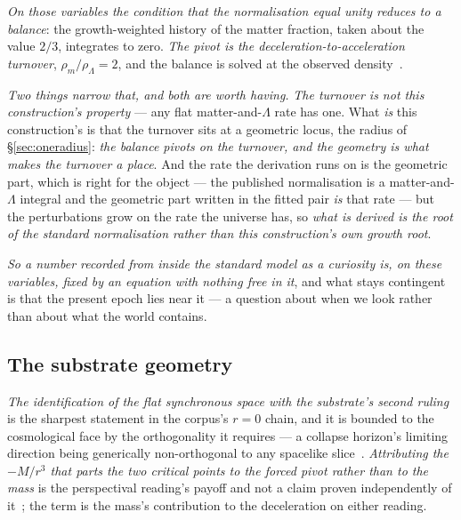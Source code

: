 \documentclass[11pt,a4paper]{article}
\theoremstyle{plain}
\theoremstyle{definition}
\begin{document}
\emph{On those variables the condition that the normalisation equal unity reduces to a balance}: the
growth-weighted history of the matter fraction, taken about the value $2/3$, integrates to zero. \emph{The pivot is the
deceleration-to-acceleration turnover}, $\rho_m/\rho_\Lambda=2$, and the balance is solved at the observed
density~\cite{JanzenCRcosmology}.

\emph{Two things narrow that, and both are worth having.} \emph{The turnover is not this construction's
property} --- any flat matter-and-$\Lambda$ rate has one. What \emph{is} this construction's is that the
turnover sits at a geometric locus, the radius of \S\ref{sec:oneradius}: \emph{the balance pivots on the
turnover, and the geometry is what makes the turnover a place}. And the rate the derivation runs on is the
geometric part, which is right for the object --- the published normalisation is a matter-and-$\Lambda$
integral and the geometric part written in the fitted pair \emph{is} that rate --- but the perturbations
grow on the rate the universe has, so \emph{what is derived is the root of the standard normalisation rather
than this construction's own growth root}.

\emph{So a number recorded from inside the standard model as a curiosity is, on these variables, fixed by an
equation with nothing free in it}, and what stays contingent is that the present epoch lies near it --- a
question about when we look rather than about what the world contains.

\subsection{The substrate geometry}

\emph{The identification of the flat synchronous space with the substrate's second ruling} is the sharpest
statement in the corpus's $r=0$ chain, and it is bounded to the cosmological face by the orthogonality it
requires --- a collapse horizon's limiting direction being generically non-orthogonal to any spacelike
slice~\cite{JanzenOperator}. \emph{Attributing the $-M/r^{3}$ that parts the two critical points to the forced pivot rather than to the mass}
is the perspectival reading's payoff and not a claim proven independently of it~\cite{JanzenGroupoid}; the
term is the mass's contribution to the deceleration on either reading.
\end{document}
